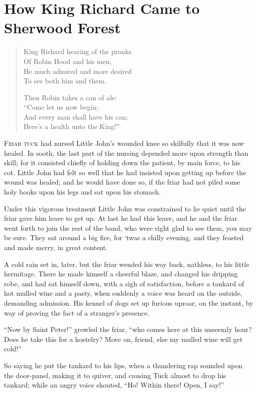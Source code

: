 \chapter{How King Richard Came to Sherwood Forest}

\begin{quote}
King Richard hearing of the pranks\\
Of Robin Hood and his men,\\
He much admired and more desired\\
To see both him and them.

Then Robin takes a can of ale:\\
“Come let us now begin;\\
And every man shall have his can;\\
Here’s a health unto the King!”
\end{quote}

\lettrine{F}{\MakeLowercase{riar Tuck}} had nursed Little John's wounded knee so
skilfully that it was now healed. In sooth, the last part of the nursing
depended more upon strength than skill; for it consisted chiefly of
holding down the patient, by main force, to his cot. Little John had felt
so well that he had insisted upon getting up before the wound was healed;
and he would have done so, if the friar had not piled some holy books
upon his legs and sat upon his stomach.

Under this vigorous treatment Little John was constrained to lie quiet
until the friar gave him leave to get up. At last he had this leave, and
he and the friar went forth to join the rest of the band, who were right
glad to see them, you may be sure. They sat around a big fire, for `twas
a chilly evening, and they feasted and made merry, in great content.

A cold rain set in, later, but the friar wended his way back, nathless,
to his little hermitage. There he made himself a cheerful blaze, and
changed his dripping robe, and had sat himself down, with a sigh of
satisfaction, before a tankard of hot mulled wine and a pasty, when
suddenly a voice was heard on the outside, demanding admission. His
kennel of dogs set up furious uproar, on the instant, by way of proving
the fact of a stranger's presence.

``Now by Saint Peter!'' growled the friar, ``who comes here at this
unseemly hour? Does he take this for a hostelry? Move on, friend, else
my mulled wine will get cold!''

So saying he put the tankard to his lips, when a thundering rap sounded
upon the door-panel, making it to quiver, and causing Tuck almost to
drop his tankard; while an angry voice shouted, ``Ho! Within there!
Open, I say!''

